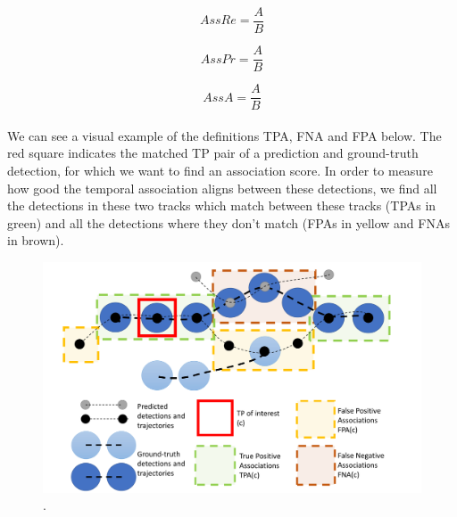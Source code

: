 \begingroup
\begin{equation}
AssRe = \frac{A}{B}
\label{e:AssRe}
\end{equation}

\begin{equation}
AssPr = \frac{A}{B}
\label{e:AssPr}
\end{equation}

\begin{equation}
AssA = \frac{A}{B}
\label{e:AssA}
\end{equation}
\endgroup
\\
We can see a visual example of the definitions TPA, FNA and FPA below. The red square indicates the matched TP pair of a prediction and ground-truth detection, for which we want to find an association score. In order to measure how good the temporal association aligns between these detections, we find all the detections in these two tracks which match between these tracks (TPAs in green) and all the detections where they don’t match (FPAs in yellow and FNAs in brown).



\begin{figure}[ht]
    \centering
    \includegraphics[width=1\textwidth]{images/05/explanation.png}
    \caption{.}
    \label{img:road}
\end{figure}

